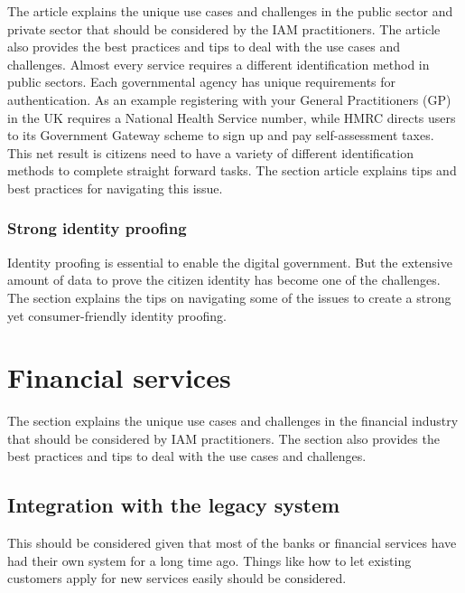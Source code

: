 The article explains the unique use cases and challenges in the public
sector and private sector that should be considered by the IAM
practitioners. The article also provides the best practices and tips to
deal with the use cases and challenges. Almost every service requires a
different identification method in public sectors. Each governmental
agency has unique requirements for authentication. As an example
registering with your General Practitioners (GP) in the UK requires a
National Health Service number, while HMRC directs users to its
Government Gateway scheme to sign up and pay self-assessment taxes. This
net result is citizens need to have a variety of different
identification methods to complete straight forward tasks. The section
article explains tips and best practices for navigating this issue.

\hypertarget{strong-identity-proofing}{%
\subsection{Strong identity
proofing}\label{strong-identity-proofing}}

Identity proofing is essential to enable the digital government. But the
extensive amount of data to prove the citizen identity has become one of
the challenges. The section explains the tips on navigating some of the
issues to create a strong yet consumer-friendly identity proofing.

\hypertarget{financial-services}{%
\chapter{Financial services}\label{financial-services}}

The section explains the unique use cases and challenges in the
financial industry that should be considered by IAM practitioners. The
section also provides the best practices and tips to deal with the use
cases and challenges.

\hypertarget{integration-with-the-legacy-system}{%
\section{Integration with the legacy
system}\label{integration-with-the-legacy-system}}

This should be considered given that most of the banks or financial
services have had their own system for a long time ago. Things like how
to let existing customers apply for new services easily should be
considered.

